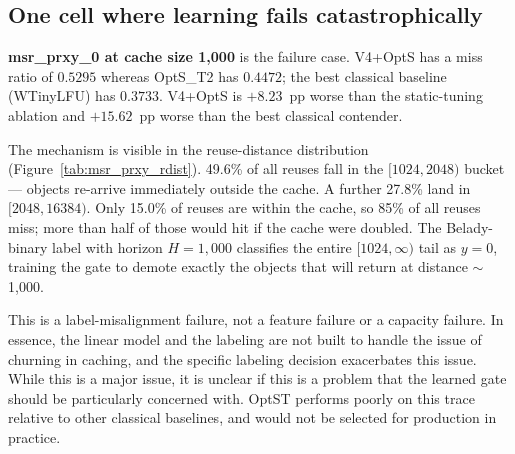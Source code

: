 \documentclass[letterpaper,twocolumn,10pt]{article}
\begin{document}
\subsection{One cell where learning fails catastrophically}

\textbf{msr\_prxy\_0 at cache size 1{,}000} is the failure case. V4+OptS has a miss ratio of $0.5295$ whereas OptS\_T2 has $0.4472$; the best classical baseline (WTinyLFU) has $0.3733$. V4+OptS is $+8.23$~pp worse than the static-tuning ablation and $+15.62$~pp worse than the best classical contender.

The mechanism is visible in the reuse-distance distribution (Figure~\ref{tab:msr_prxy_rdist}). 49.6\% of all reuses fall in the $[1024, 2048)$ bucket --- objects re-arrive immediately outside the cache. A further 27.8\% land in $[2048, 16384)$. Only 15.0\% of reuses are within the cache, so 85\% of all reuses miss; more than half of those would hit if the cache were doubled. The Belady-binary label with horizon $H = 1{,}000$ classifies the entire $[1024, \infty)$ tail as $y=0$, training the gate to demote exactly the objects that will return at distance $\sim$1{,}000. 

This is a label-misalignment failure, not a feature failure or a capacity failure. In essence, the linear model and the labeling are not built to handle the issue of churning in caching, and the specific labeling decision exacerbates this issue. While this is a major issue, it is unclear if this is a problem that the learned gate should be particularly concerned with. OptST performs poorly on this trace relative to other classical baselines, and would not be selected for production in practice. 
\end{document}
